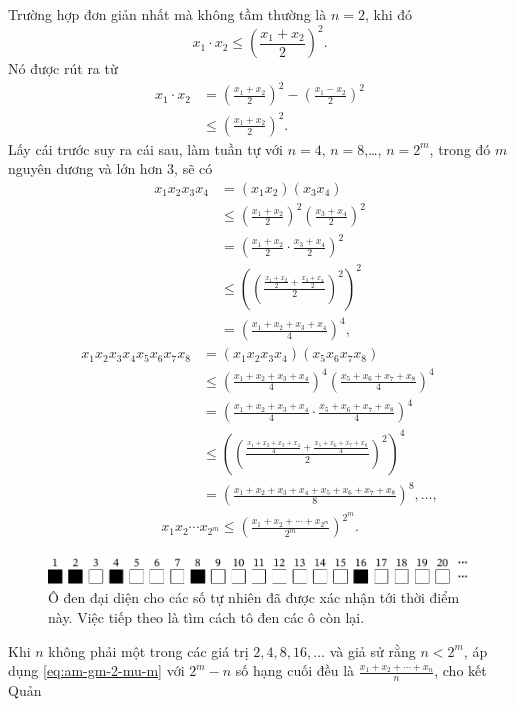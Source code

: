 \documentclass[12pt]{article} %
\begin{document}
Trường hợp đơn giản nhất mà không tầm thường là \(n=2\), khi đó
\begin{equation}
    x_1\cdot x_2 \leq \left(\frac{x_1+x_2}{2}\right)^2.
\end{equation}
Nó được rút ra từ
\begin{align*}
    x_1\cdot x_2&=\left(\frac{x_1+x_2}{2}\right)^2-\left(\frac{x_1-x_2}{2}\right)^2\\&\leq \left(\frac{x_1+x_2}{2}\right)^2.
\end{align*}
Lấy cái trước suy ra cái sau, làm tuần tự với \(n=4\), \(n=8\),\dots, \(n=2^m\), trong đó \(m\) nguyên dương và lớn hơn \(3\), sẽ có
\begin{align*}
    x_1x_2x_3x_4&=(x_1x_2)(x_3x_4)\\&\leq\left(\frac{x_1+x_2}{2}\right)^2\left(\frac{x_3+x_4}{2}\right)^2\\&=\left(\frac{x_1+x_2}{2}\cdot\frac{x_3+x_4}{2}\right)^2\\&\leq\left(\left(\frac{\frac{x_1+x_2}{2}+\frac{x_3+x_4}{2}}{2}\right)^2\right)^2\\&=\left(\frac{x_1+x_2+x_3+x_4}{4}\right)^4,
\end{align*}
\begin{align*}
    x_1x_2x_3x_4x_5x_6x_7x_8&=(x_1x_2x_3x_4)(x_5x_6x_7x_8)\\&\leq\left(\frac{x_1+x_2+x_3+x_4}{4}\right)^4\left(\frac{x_5+x_6+x_7+x_8}{4}\right)^4\\&=\left(\frac{x_1+x_2+x_3+x_4}{4}\cdot\frac{x_5+x_6+x_7+x_8}{4}\right)^4\\&\leq\left(\left(\frac{\frac{x_1+x_2+x_3+x_4}{4}+\frac{x_5+x_6+x_7+x_8}{4}}{2}\right)^2\right)^4\\&=\left(\frac{x_1+x_2+x_3+x_4+x_5+x_6+x_7+x_8}{8}\right)^8,\dots,
\end{align*}
\begin{align}
    x_1x_2\cdots x_{2^m}\leq\left(\frac{x_1+x_2+\cdots+x_{2^m}}{2^m}\right)^{2^m}. \label{eq:am-gm-2-mu-m}
\end{align}
\begin{figure}[htbp]
    \centering
    \includegraphics{./tex-images/cac-so-tu-nhien-2-mu/cac-so-tu-nhien-2-mu.pdf}
    \caption{Ô đen đại diện cho các số tự nhiên đã được xác nhận tới thời điểm này. Việc tiếp theo là tìm cách tô đen các ô còn lại.}
\end{figure}
Khi \(n\) không phải một trong các giá trị \(2,4,8,16,\dots\) và giả sử rằng \(n<2^m\), áp dụng \eqref{eq:am-gm-2-mu-m} với \(2^m-n\) số hạng cuối đều là \(\frac{x_1+x_2+\cdots+x_n}{n}\), cho kết Quản
\end{document}
